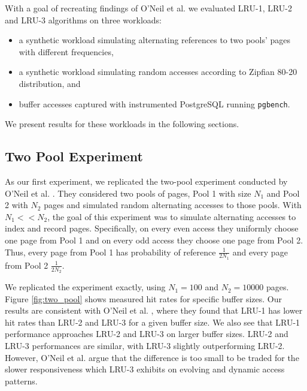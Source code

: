 With a goal of recreating findings of O'Neil et al. \cite{lruk} we evaluated LRU-1, LRU-2 and LRU-3 algorithms on three workloads:
\begin{itemize}
\item a synthetic workload simulating alternating references to two pools' pages with different frequencies,
\item a synthetic workload simulating random accesses according to Zipfian 80-20 distribution, and
\item buffer accesses captured with instrumented PostgreSQL running \texttt{pgbench}.
\end{itemize}

We present results for these workloads in the following sections.

\subsection{Two Pool Experiment}

As our first experiment, we replicated the two-pool experiment conducted by O'Neil et al. \cite{lruk}. They considered two pools of pages, Pool 1 with size $N_1$ and Pool 2 with $N_2$ pages and simulated random alternating accesses to those pools. With $N_1 << N_2$, the goal of this experiment was to simulate alternating accesses to index and record pages. Specifically, on every even access they uniformly choose one page from Pool 1 and on every odd access they choose one page from Pool 2. Thus, every page from Pool 1 has probability of reference $\frac{1}{2N_1}$ and every page from Pool 2 $\frac{1}{2N_2}$.

We replicated the experiment exactly, using $N_1 = 100$ and $N_2 = 10000$ pages. Figure \ref{fig:two_pool} shows measured hit rates for specific buffer sizes. Our results are consistent with O'Neil et al. \cite{lruk}, where they found that LRU-1 has lower hit rates than LRU-2 and LRU-3 for a given buffer size. We also see that LRU-1 performance approaches LRU-2 and LRU-3 on larger buffer sizes. LRU-2 and LRU-3 performances are similar, with LRU-3 slightly outperforming LRU-2. However, O'Neil et al. argue that the difference is too small to be traded for the slower responsiveness which LRU-3 exhibits on evolving and dynamic access patterns.

